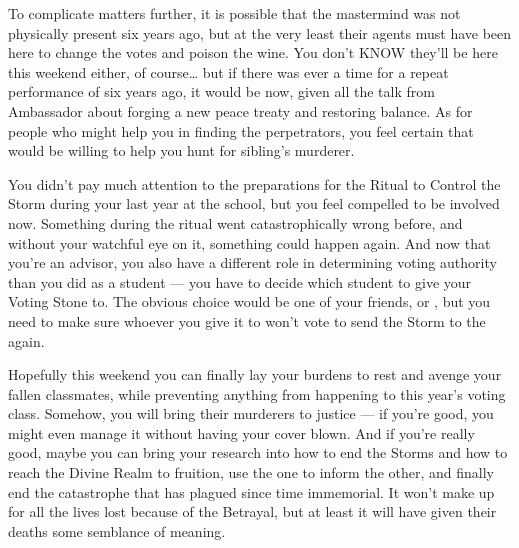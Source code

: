 \documentclass[char]{GL2020}
\begin{document}
To complicate matters further, it is possible that the mastermind was not physically present six years ago, but at the very least their agents must have been here to change the votes and poison the wine. You don't KNOW they'll be here this weekend either, of course\ldots{} but if there was ever a time for a repeat performance of six years ago, it would be now, given all the talk from Ambassador \cHeadDiplomat{\intro} about forging a new peace treaty and restoring balance. As for people who might help you in finding the perpetrators, you feel certain that \cHeir{} would be willing to help you hunt for \cHeir{\their} sibling’s murderer. 

You didn't pay much attention to the preparations for the Ritual to Control the Storm during your last year at the school, but you feel compelled to be involved now. Something during the ritual went catastrophically wrong before, and without your watchful eye on it, something could happen again. And now that you're an advisor, you also have a different role in determining voting authority than you did as a student — you have to decide which student to give your Voting Stone to. The obvious choice would be one of your friends, \cHeir{} or \cTechStar{}, but you need to make sure whoever you give it to won’t vote to send the Storm to the \pShippies{} again. 

Hopefully this weekend you can finally lay your burdens to rest and avenge your fallen classmates, while preventing anything from happening to this year's voting class. Somehow, you will bring their murderers to justice — if you're good, you might even manage it without having your cover blown. And if you’re really good, maybe you can bring your research into how to end the Storms and how to reach the Divine Realm to fruition, use the one to inform the other, and finally end the catastrophe that has plagued \pEarth{} since time immemorial. It won’t make up for all the lives lost because of the Betrayal, but at least it will have given their deaths some semblance of meaning. 
\end{document}
